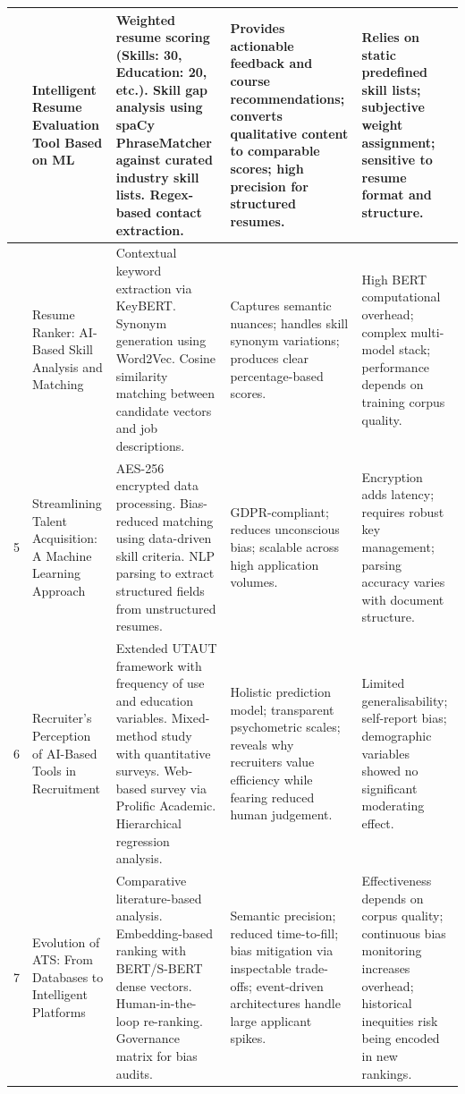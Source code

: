 \documentclass[12pt,a4paper]{report}
\begin{document}
\begin{longtable}{|>{\centering\arraybackslash}p{0.6cm}|p{3.1cm}|p{3.6cm}|p{3.2cm}|p{3.2cm}|}
3 & Intelligent Resume Evaluation Tool Based on ML \cite{ref3} &
Weighted resume scoring (Skills: 30, Education: 20, etc.). Skill gap analysis using spaCy PhraseMatcher against curated industry skill lists. Regex-based contact extraction. &
Provides actionable feedback and course recommendations; converts qualitative content to comparable scores; high precision for structured resumes. &
Relies on static predefined skill lists; subjective weight assignment; sensitive to resume format and structure. \\
\hline

4 & Resume Ranker: AI-Based Skill Analysis and Matching \cite{ref4} &
Contextual keyword extraction via KeyBERT. Synonym generation using Word2Vec. Cosine similarity matching between candidate vectors and job descriptions. &
Captures semantic nuances; handles skill synonym variations; produces clear percentage-based scores. &
High BERT computational overhead; complex multi-model stack; performance depends on training corpus quality. \\
\hline

5 & Streamlining Talent Acquisition: A Machine Learning Approach \cite{ref5} &
AES-256 encrypted data processing. Bias-reduced matching using data-driven skill criteria. NLP parsing to extract structured fields from unstructured resumes. &
GDPR-compliant; reduces unconscious bias; scalable across high application volumes. &
Encryption adds latency; requires robust key management; parsing accuracy varies with document structure. \\
\hline

6 & Recruiter's Perception of AI-Based Tools in Recruitment \cite{ref6} &
Extended UTAUT framework with frequency of use and education variables. Mixed-method study with quantitative surveys. Web-based survey via Prolific Academic. Hierarchical regression analysis. &
Holistic prediction model; transparent psychometric scales; reveals why recruiters value efficiency while fearing reduced human judgement. &
Limited generalisability; self-report bias; demographic variables showed no significant moderating effect. \\
\hline

7 & Evolution of ATS: From Databases to Intelligent Platforms \cite{ref7} &
Comparative literature-based analysis. Embedding-based ranking with BERT/S-BERT dense vectors. Human-in-the-loop re-ranking. Governance matrix for bias audits. &
Semantic precision; reduced time-to-fill; bias mitigation via inspectable trade-offs; event-driven architectures handle large applicant spikes. &
Effectiveness depends on corpus quality; continuous bias monitoring increases overhead; historical inequities risk being encoded in new rankings. \\
\hline


\end{longtable}
\end{document}
